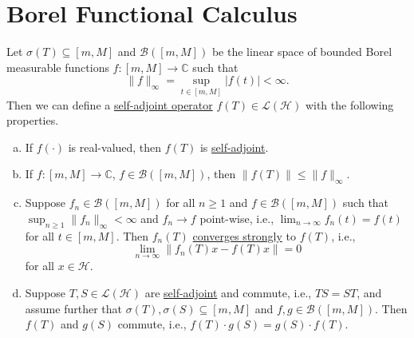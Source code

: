 \section{Borel Functional Calculus}

\begin{theorem}\label{thm:Borel-functional-calculus}
	Let \(\sigma (T) \subseteq [m, M]\) and \(\mathcal{B} ([m, M])\) be the linear space of bounded Borel measurable functions \(f\colon [m, M] \to\mathbb{C}  \) such that
	\[
		\lVert f \rVert _\infty = \sup _{t\in[m, M]} \vert f(t) \vert  < \infty.
	\]
	Then we can define a \hyperref[def:self-adjoint-op]{self-adjoint operator} \(f(T)\in \mathcal{L} (\mathcal{H} )\) with the following properties.
	\begin{enumerate}[(a)]
		\item If \(f(\cdot)\) is real-valued, then \(f(T)\) is \hyperref[def:self-adjoint-op]{self-adjoint}.
		\item If \(f\colon [m, M] \to \mathbb{C} \), \(f\in \mathcal{B} ([m, M])\), then \(\lVert f(T) \rVert \leq \lVert f \rVert _\infty \).
		\item Suppose \(f_n \in \mathcal{B} ([m, M])\) for all \(n\geq 1\) and \(f\in \mathcal{B} ([m, M])\) such that \(\sup _{n\geq 1}\lVert f_n \rVert _\infty < \infty \) and \(f_n \to f\) point-wise, i.e., \(\lim_{n \to \infty} f_n(t) = f(t)\) for all \(t\in [m, M]\). Then \(f_n(T)\) \hyperref[def:strongly-convergence]{converges strongly} to \(f(T)\), i.e.,
		      \[
			      \lim_{n \to \infty} \lVert f_n(T) x - f(T) x \rVert = 0
		      \]
		      for all \(x\in \mathcal{H} \).
		\item Suppose \(T, S \in \mathcal{L} (\mathcal{H} )\) are \hyperref[def:self-adjoint-op]{self-adjoint} and commute, i.e., \(TS = ST\), and assume further that \(\sigma (T), \sigma (S) \subseteq [m, M]\) and \(f, g\in \mathcal{B} ([m, M])\). Then \(f(T)\) and \(g(S)\) commute, i.e., \(f(T) \cdot g(S) = g(S) \cdot f(T)\).
	\end{enumerate}
\end{theorem}